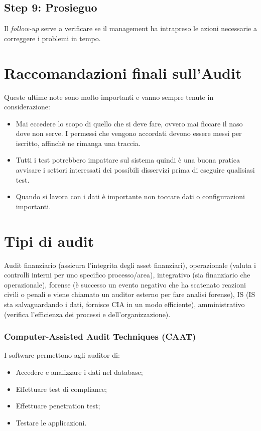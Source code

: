 \subsection{Step 9: Prosieguo}


Il \textit{follow-up} serve a verificare se il management ha intrapreso le azioni
necessarie a correggere i problemi in tempo.

\section{Raccomandazioni finali sull'Audit}

Queste ultime note sono molto importanti e vanno sempre tenute in
considerazione:
\begin{itemize}
\item Mai eccedere lo scopo di quello che si deve fare, ovvero mai ficcare il
naso dove non serve. I permessi che vengono accordati devono essere messi per
iscritto, affinchè ne rimanga una traccia.
\item Tutti i test potrebbero impattare sul sistema quindi è una buona
pratica avvisare i settori interessati dei possibili disservizi prima di eseguire
qualisiasi test.
\item Quando si lavora con i dati è importante non toccare dati o configurazioni
importanti.
\end{itemize}


\section{Tipi di audit}

Audit finanziario (assicura l'integrita degli asset finanziari),
operazionale (valuta i controlli interni per uno specifico processo/area),
integrativo (sia finanziario che operazionale), forense (è successo un evento
negativo che ha scatenato reazioni civili o penali e viene chiamato un auditor
esterno per fare analisi forense), IS (IS sta salvaguardando i dati, fornisce
CIA in un modo efficiente), amministrativo (verifica l'efficienza dei processi
e dell'organizzazione).

\subsubsection{Computer-Assisted Audit Techniques (CAAT)}

I software permettono agli auditor di:
\begin{itemize}
\item Accedere e analizzare i dati nel database;
\item Effettuare test di compliance;
\item Effettuare penetration test;
\item Testare le applicazioni.
\end{itemize}


